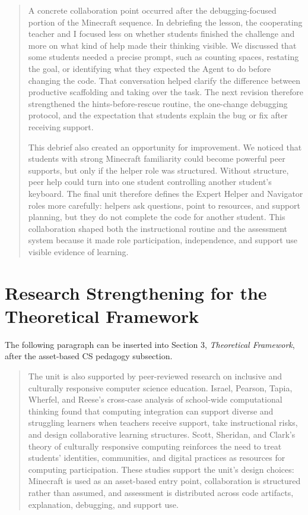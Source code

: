 \documentclass[12pt]{article}
\begin{document}
\begin{quote}
A concrete collaboration point occurred after the debugging-focused portion of the Minecraft sequence. In debriefing the lesson, the cooperating teacher and I focused less on whether students finished the challenge and more on what kind of help made their thinking visible. We discussed that some students needed a precise prompt, such as counting spaces, restating the goal, or identifying what they expected the Agent to do before changing the code. That conversation helped clarify the difference between productive scaffolding and taking over the task. The next revision therefore strengthened the hints-before-rescue routine, the one-change debugging protocol, and the expectation that students explain the bug or fix after receiving support.

This debrief also created an opportunity for improvement. We noticed that students with strong Minecraft familiarity could become powerful peer supports, but only if the helper role was structured. Without structure, peer help could turn into one student controlling another student's keyboard. The final unit therefore defines the Expert Helper and Navigator roles more carefully: helpers ask questions, point to resources, and support planning, but they do not complete the code for another student. This collaboration shaped both the instructional routine and the assessment system because it made role participation, independence, and support use visible evidence of learning.
\end{quote}

\section{Research Strengthening for the Theoretical Framework}

The following paragraph can be inserted into Section 3, \emph{Theoretical Framework}, after the asset-based CS pedagogy subsection.

\begin{quote}
The unit is also supported by peer-reviewed research on inclusive and culturally responsive computer science education. Israel, Pearson, Tapia, Wherfel, and Reese's cross-case analysis of school-wide computational thinking found that computing integration can support diverse and struggling learners when teachers receive support, take instructional risks, and design collaborative learning structures. Scott, Sheridan, and Clark's theory of culturally responsive computing reinforces the need to treat students' identities, communities, and digital practices as resources for computing participation. These studies support the unit's design choices: Minecraft is used as an asset-based entry point, collaboration is structured rather than assumed, and assessment is distributed across code artifacts, explanation, debugging, and support use.
\end{quote}
\end{document}
